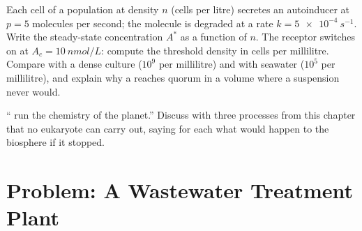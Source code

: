 \begin{exercise}[$\star\star\star$]\label{exo:b2:microbial-metabolism:11}
Each cell of a population at density $n$ (cells per litre) secretes an
autoinducer at $p = 5$ molecules per second; the molecule is
degraded at a rate $k = \qty{5e-4}{s^{-1}}$. Write the steady-state
concentration $A^*$ as a function of $n$. The receptor switches on
at $A_c = \qty{10}{nmol/L}$: compute the threshold density in cells
per millilitre. Compare with a dense culture ($10^{9}$ per
millilitre) and with seawater ($10^{5}$ per millilitre), and explain
why a  reaches quorum in a volume where a suspension never
would.
\end{exercise}

\begin{exercise}[$\star\star\star$]\label{exo:b2:microbial-metabolism:12}
`` run the chemistry of the planet.'' Discuss with three
processes from this chapter that no eukaryote can carry out, saying
for each what would happen to the biosphere if it stopped.
\end{exercise}

\section{Problem: A Wastewater Treatment Plant}

